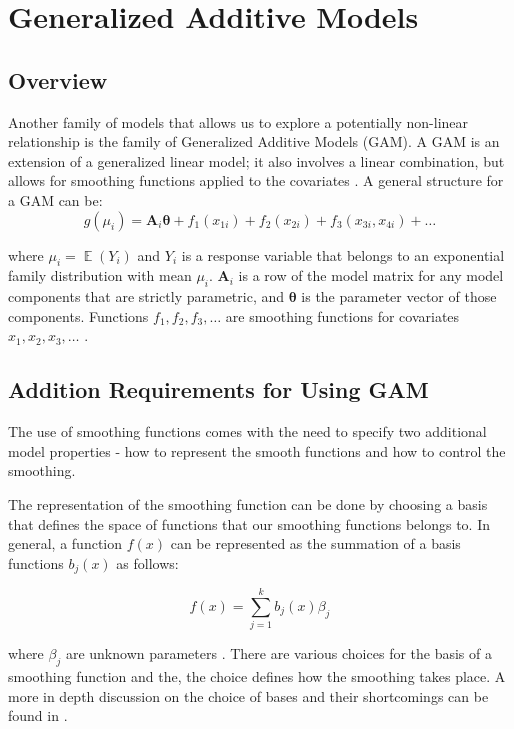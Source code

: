 \section{Generalized Additive Models}

\subsection{Overview}
Another family of models that allows us to explore a potentially non-linear relationship is the family of Generalized Additive Models (GAM). A GAM is an extension of a generalized linear model; it also involves a linear combination, but allows for smoothing functions applied to the covariates \citep{hastie2017generalized}. A general structure for a GAM can be: 
\setlength\abovedisplayskip{4pt}
\setlength\belowdisplayskip{4pt}
\begin{equation*}
g\left(\mu_{i}\right)=\mathbf{A}_{i} \boldsymbol{\theta}+f_{1}\left(x_{1 i}\right)+f_{2}\left(x_{2 i}\right)+f_{3}\left(x_{3 i}, x_{4 i}\right)+\ldots
\end{equation*}

where $\mu_{i} = \mathop{\mathbb{E}}(Y_i)$  and $Y_i$ is a response variable that belongs to an exponential family distribution with mean $\mu_{i}$. $\mathbf{A}_{i}$ is a row of the model matrix for any model components that are strictly parametric, and $\boldsymbol{\theta}$ is the parameter vector of those components. Functions $f_1, f_2, f_3, \ldots$ are smoothing functions for covariates $x_1, x_2, x_3, \ldots$  \citep{wood2017generalized}. 

\subsection{Addition Requirements for Using GAM}

The use of smoothing functions comes with the need to specify two additional model properties - how to represent the smooth functions and how to control the smoothing. 

The representation of the smoothing function can be done by choosing a basis that defines the space of functions that our smoothing functions belongs to. In general, a function $f(x)$ can be represented as the summation of a basis functions $b_{j}(x)$ as follows: 

$$
f(x)=\sum_{j=1}^{k} b_{j}(x) \beta_{j}
$$

where $\beta_{j}$ are unknown parameters  \citep{wood2017generalized}. There are various choices for the basis of a smoothing function and the, the choice defines how the smoothing takes place. A more in depth discussion on the choice of bases and their shortcomings can be found in . 

